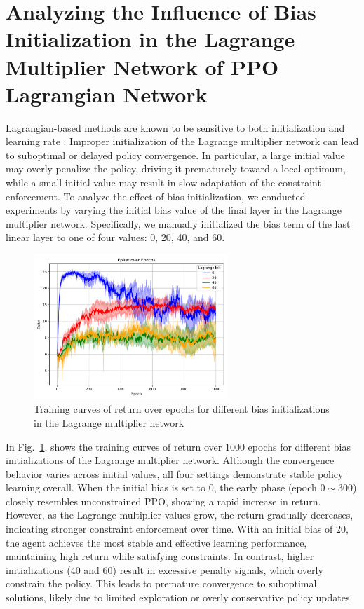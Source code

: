 \section{Analyzing the Influence of Bias Initialization in the Lagrange Multiplier Network of PPO Lagrangian Network} \label{chap4:sec:experiments:lagrange_init}

Lagrangian-based methods are known to be sensitive to both initialization and learning rate \cite{CRL-survey}. 
Improper initialization of the Lagrange multiplier network can lead to suboptimal or delayed policy convergence. 
In particular, a large initial value may overly penalize the policy, driving it prematurely toward a local optimum, while a small initial value may result in slow adaptation of the constraint enforcement.
To analyze the effect of bias initialization,  we conducted experiments by varying the initial bias value of the final layer in the Lagrange multiplier network. 
Specifically, we manually initialized the bias term of the last linear layer to one of four values: 0, 20, 40, and 60.

\begin{figure}[h]
  \centering
  \includegraphics[width=0.65\textwidth]{imgs/chap4/lagrange_init/return.pdf}
  \caption{Training curves of return over epochs for different bias initializations in the Lagrange multiplier network}
  \label{chap4:fig:lagrange_init_return}
\end{figure}

\noindent In Fig.~\ref{chap4:fig:lagrange_init_return}, shows the training curves of return over 1000 epochs for different bias initializations of the Lagrange multiplier network.
Although the convergence behavior varies across initial values, all four settings demonstrate stable policy learning overall.
When the initial bias is set to 0, the early phase (epoch $0 \sim 300$) closely resembles unconstrained PPO, showing a rapid increase in return.
However, as the Lagrange multiplier values grow, the return gradually decreases, indicating stronger constraint enforcement over time.
With an initial bias of 20, the agent achieves the most stable and effective learning performance, maintaining high return while satisfying constraints.
In contrast, higher initializations (40 and 60) result in excessive penalty signals, which overly constrain the policy.
This leads to premature convergence to suboptimal solutions, likely due to limited exploration or overly conservative policy updates.

